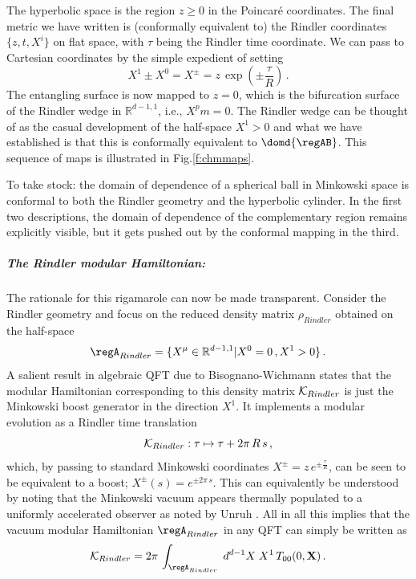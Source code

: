 \documentclass[12pt,openany]{book}
\begin{document}
The hyperbolic space is the region $z \geq 0$ in the Poincar\'e coordinates. The final metric we have written is (conformally equivalent to) the Rindler coordinates   $\{z,t,X^i\}$ on flat space, with $\tau$ being the Rindler time coordinate. We can pass to Cartesian coordinates by the simple expedient of setting
%
\begin{equation}
X^1 \pm X^0 = X^\pm = z\, \exp\left(\pm \frac{\tau}{R}\right) \,.
\label{eq:Rcart}
\end{equation}
%
The entangling surface is now mapped to $z=0$, which is the bifurcation surface of the Rindler wedge in ${\mathbb R}^{d-1,1}$,
i.e., $X^pm=0$. The Rindler wedge can be thought of as the casual development of the half-space $X^1>0$ and what we have established is that this is conformally equivalent to $\domd{\regAB}$. This sequence of maps is illustrated in Fig.\ref{f:chmmaps}.

To take stock: the domain of dependence of a spherical ball in Minkowski space is conformal to both the Rindler geometry and the hyperbolic cylinder. In the first two descriptions, the domain of dependence of the complementary region remains explicitly visible, but it gets pushed out by the conformal mapping in the third.

\subparagraph{The Rindler modular Hamiltonian:} The rationale for this rigamarole can now be made transparent. Consider the Rindler geometry and  focus on the reduced density matrix  $\rho_{Rindler} $ obtained on the half-space
%
\begin{equation}
\regA_{Rindler} =\{ X^\mu \in {\mathbb R}^{d-1,1} | X^0 = 0\,, X^1 > 0\} \,.
\label{eq:rindler}
\end{equation}
%
  A salient result in algebraic QFT due to Bisognano-Wichmann \cite{Bisognano:1975ih,Bisognano:1976za} states that the modular Hamiltonian corresponding to this density matrix ${\cal K}_{Rindler}$ is just the Minkowski boost generator in the direction $X^1$. It implements a modular evolution as a  Rindler time translation
%
\begin{equation}
{\cal K}_{Rindler}: \tau \mapsto \tau + 2\pi\, R\, s \,,
\label{}
\end{equation}
%
which, by passing to standard Minkowski coordinates $X^\pm = z\, e^{\pm \frac{\tau}{R}} $, can be seen to be equivalent to a boost;
$X^\pm(s) = e^{\pm 2\pi\, s}$. This can equivalently be understood by noting that the Minkowski vacuum appears thermally populated to a uniformly accelerated observer as noted by Unruh \cite{Unruh:1976db}. All in all this implies that the vacuum modular Hamiltonian $\regA_{Rindler}$ in any QFT can simply be written as
%
\begin{equation}
{\cal K}_{Rindler} = 2\pi\, \int_{\regA_{Rindler}} \; d^{d-1}X\; X^1\, T_{00}(0,{\bf X})\,.
\label{eq:RindlermodH}
\end{equation}
%
\end{document}
